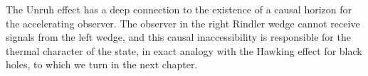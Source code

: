 
The Unruh effect has a deep connection to the existence of a causal
horizon for the accelerating observer. The observer in the right
Rindler wedge cannot receive signals from the left wedge, and this
causal inaccessibility is responsible for the thermal character of
the state, in exact analogy with the Hawking effect for black holes,
to which we turn in the next chapter.
